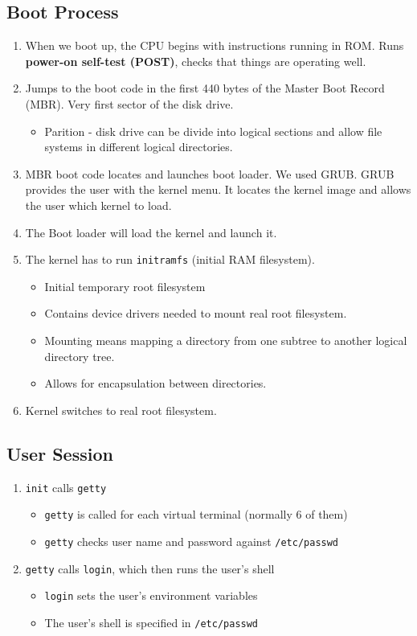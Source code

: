 \documentclass[]{article}
\begin{document}
\subsection{Boot Process}
\begin{enumerate}
\item When we boot up, the CPU begins with instructions running in ROM. Runs
\textbf{power-on self-test (POST)}, checks that things are operating well.
\item Jumps to the boot code in the first 440 bytes of the Master Boot Record
(MBR). Very first sector of the disk drive.
\begin{itemize}
\item Parition - disk drive can be divide into logical sections and allow file
systems in different logical directories.
\end{itemize}
\item MBR boot code locates and launches boot loader. We used GRUB. GRUB
provides the user with the kernel menu. It locates the kernel image and allows
the user which kernel to load.
\item The Boot loader will load the kernel and launch it.
\item The kernel has to run \texttt{initramfs} (initial RAM filesystem).
\begin{itemize}
\item Initial temporary root filesystem
\item Contains device drivers needed to mount real root filesystem.
\item Mounting means mapping a directory from one subtree to another logical
directory tree.
\item Allows for encapsulation between directories.
\end{itemize}
\item Kernel switches to real root filesystem.
\end{enumerate}

\subsection{User Session}
\begin{enumerate}
\item \texttt{init} calls \texttt{getty}
\begin{itemize}
\item \texttt{getty} is called for each virtual terminal (normally 6 of them)
\item \texttt{getty} checks user name and password against \texttt{/etc/passwd}
\end{itemize}
\item \texttt{getty} calls \texttt{login}, which then runs the user's shell
\begin{itemize}
\item \texttt{login} sets the user's environment variables
\item The user's shell is specified in \texttt{/etc/passwd}
\end{itemize}
\end{enumerate}
\end{document}
